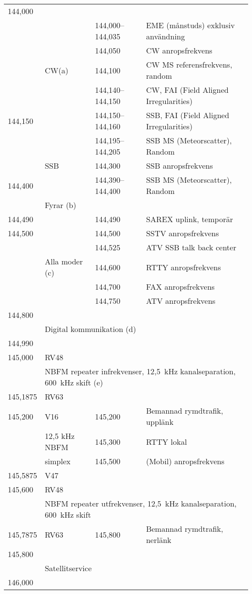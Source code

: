 \begin{longtable}{llll}
144,000 & & & \\
        &       & 144,000--144,035 & EME (månstuds) exklusiv användning \\
        &       & 144,050           & CW anropsfrekvens \\
        & CW(a) & 144,100           & CW MS referensfrekvens, random \\
        &       & 144,140--144,150 & CW, FAI (Field Aligned Irregularities) \\
144,150 &       & 144,150--144,160 & SSB, FAI (Field Aligned Irregularities) \\
        &       & 144,195--144,205 & SSB MS (Meteorscatter), Random \\
        & SSB   & 144,300           & SSB anropsfrekvens \\
144,400 &       & 144,390--144,400 & SSB MS (Meteorscatter), Random \\
        & Fyrar (b) & & \\
144,490 &       & 144,490 & SAREX uplink, temporär \\
144,500 &       & 144,500 & SSTV anropsfrekvens \\
        &       & 144,525 & ATV SSB talk back center \\
        & Alla moder (c) & 144,600 & RTTY anropsfrekvens \\
        &       & 144,700 & FAX anropsfrekvens \\
        &       & 144,750 & ATV anropsfrekvens \\
144,800 & & & \\
        & \multicolumn{3}{l}{Digital kommunikation (d)} \\
144,990 & & & \\
145,000 & RV48 & & \\
        & \multicolumn{3}{l}{NBFM repeater infrekvenser, 12,5~kHz kanalseparation, 600~kHz skift (e)} \\
145,1875 & RV63 & & \\
145,200 & V16   & 145,200 & Bemannad rymdtrafik, upplänk \\
        & 12,5 kHz NBFM & 145,300 & RTTY lokal \\
        & simplex & 145,500 & (Mobil) anropsfrekvens \\
145,5875 & V47 & & \\
145,600 & RV48 & & \\
        & \multicolumn{3}{l}{NBFM repeater utfrekvenser, 12,5~kHz kanalseparation, 600~kHz skift} \\
145,7875 & RV63 & 145,800 & Bemannad rymdtrafik, nerlänk \\
145,800 & & & \\
        & \multicolumn{3}{l}{Satellitservice} \\
146,000 & & & \\
\end{longtable}

